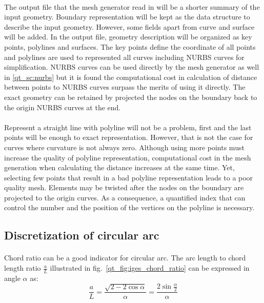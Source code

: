 \paragraph{}
The output file that the mesh generator read in will be a shorter summary of the input geometry.
Boundary representation will be kept as the data structure to describe the input geometry.
However, some fields apart from curve and surface will be added.
In the output file, geometry description will be organized as key points, polylines and surfaces.
The key points define the coordinate of all points and polylines are used to represented all curves including NURBS curves for simplification.
NURBS curves can be used directly by the mesh generator as well in \ref{qt_sc:nurbs} but it is found the computational cost in calculation of distance between points to NURBS curves surpass the merits of using it directly.
The exact geometry can be retained by projected the nodes on the boundary back to the origin NURBS curves at the end.

\paragraph{}
Represent a straight line with polyline will not be a problem, first and the last points will be enough to exact representation.
However, that is not the case for curves where curvature is not always zero.
Although using more points must increase the quality of polyline representation, computational cost in the mesh generation when calculating the distance increases at the same time.
Yet, selecting few points that result in a bad polyline representation leads to a poor quality mesh.
Elements may be twisted after the nodes on the boundary are projected to the origin curves.
As a consequence, a quantified index that can control the number and the position of the vertices on the polyline is necessary.

\subsection{Discretization of circular arc}
\paragraph{}
Chord ratio can be a good indicator for circular arc.
The arc length to chord length ratio $\frac{a}{L}$ illustrated in fig.~\ref{qt_fig:iges_chord_ratio} can be expressed in angle $\alpha$ as:
    \begin{equation}
        \frac{a}{L} = \frac{
            \sqrt{2-2\cos\alpha}
        }{\alpha}
        = \frac{
            2\sin\frac{\alpha}{2}
        }{\alpha}
    \end{equation}

